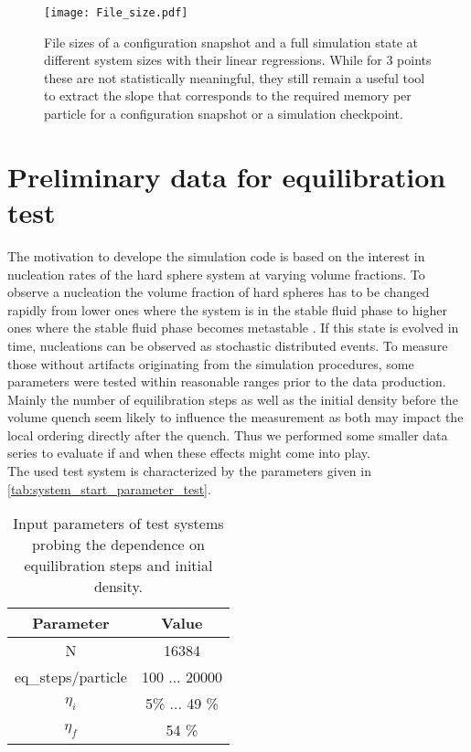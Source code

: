\begin{figure}[h!]
\centering
\texttt{[image: File\_size.pdf]}
\caption[File size estimate]{File sizes of a configuration snapshot and a full simulation state at different system sizes with their linear regressions. While for 3 points these are not statistically meaningful, they still remain a useful tool to extract the slope that corresponds to the required memory per particle for a configuration snapshot or a simulation checkpoint.}
\label{fig:file_size}
\end{figure}

\section{Preliminary data for equilibration test}
\label{sec:data}
The motivation to develope the simulation code is based on the interest in nucleation rates of the hard sphere system at varying volume fractions. To observe a nucleation the volume fraction of hard spheres has to be changed rapidly from lower ones where the system is in the stable fluid phase to higher ones where the stable fluid phase becomes metastable . If this state is evolved in time, nucleations can be observed as stochastic distributed events. To measure those without artifacts originating from the simulation procedures, some parameters were tested within reasonable ranges prior to the data production.\\
Mainly the number of equilibration steps as well as the initial density before the volume quench seem likely to influence the measurement as both may impact the local ordering directly after the quench. Thus we performed some smaller data series to evaluate if and when these effects might come into play.\\
The used test system is characterized by the parameters given in \autoref{tab:system_start_parameter_test}.\\

\begin{table}
\centering
\begin{tabular}{c|c}
Parameter & Value \\ \hline
N & 16384 \\
eq\_steps/particle & 100 ... 20000 \\
$\eta_i$ & 5\% ... 49 \% \\
$\eta_f$ & 54 \% \\
\end{tabular}
\caption[Simulation parameters for testing equilibration step number and initial density]{Input parameters of test systems probing the dependence on equilibration steps and initial density.}
\label{tab:system_start_parameter_test}
\end{table}

